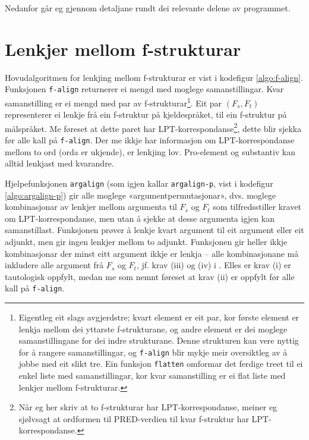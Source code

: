 \documentclass[11pt,a4paper,oneside,draft]{book}
\begin{document}
Nedanfor går eg gjennom detaljane rundt dei relevante delene av
programmet.

\section{Lenkjer mellom f-strukturar}
\label{sec-4.1}

\label{SEC:impl-f-lenkjing}

Hovudalgoritmen for lenkjing mellom f-strukturar er vist i kodefigur
\ref{algo:f-align}. Funksjonen \texttt{f-align} returnerer ei mengd med
moglege samanstillingar. Kvar samanstilling er ei mengd med par av
f-strukturar\footnote{Eigentleg eit slags avgjerdstre; kvart element er eit par, kor
        første element er lenkja mellom dei yttarste f-strukturane, og
        andre element er dei moglege samanstillingane for dei indre
        strukturane. Denne strukturen kan vere nyttig for å rangere
        samanstillingar, og \texttt{f-align} blir mykje meir oversiktleg av å
        jobbe med eit slikt tre. Ein funksjon \texttt{flatten} omformar det
        ferdige treet til ei enkel liste med samanstillingar, kor kvar
        samanstilling er ei flat liste med lenkjer mellom
        f-strukturar. }. Eit par $(F_s,F_t)$ representerer ei lenkje frå
ein f-struktur på kjeldespråket, til ein f-struktur på målspråket. Me
føreset at dette paret har LPT-korrespondanse\footnote{Når eg her skriv at to f-strukturar har LPT-korrespondanse,
        meiner eg sjølvsagt at ordformen til PRED-verdien til kvar
        f-struktur har LPT-korrespondanse. }, dette blir
sjekka før alle kall på \texttt{f-align}. Der me ikkje har informasjon om
LPT-korrespondanse mellom to ord (orda er ukjende), er lenkjing
lov. Pro-element og substantiv kan alltid lenkjast med kvarandre.

Hjelpefunksjonen \texttt{argalign} (som igjen kallar \texttt{argalign-p}, vist i
kodefigur \ref{algo:argalign-p}) gir alle moglege
«argumentpermutasjonar», dvs. moglege kombinasjonar av lenkjer mellom
argumenta til $F_s$ og $F_t$ som tilfredsstiller kravet om
LPT-korrespondanse, men utan å sjekke at desse argumenta igjen kan
samanstillast. Funksjonen prøver å lenkje kvart argument til eit
argument eller eit adjunkt, men gir ingen lenkjer mellom to
adjunkt. Funksjonen gir heller ikkje kombinasjonar der minst eitt
argument ikkje er lenkja -- alle kombinasjonane må inkludere alle
argument frå $F_s$ og $F_t$, jf. krav (iii) og (iv) i
\citet[s.~75]{dyvik2009lmp}. Elles er krav (i) er tautologisk oppfylt,
medan me som nemnt føreset at krav (ii) er oppfylt før alle kall på
\texttt{f-align}.
\end{document}
